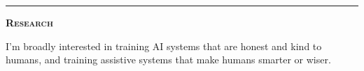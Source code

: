 \documentclass[11 pt]{article}
\begin{document}
\begin{itemize}







\end{itemize}

\vspace{6pt}

\hrule

\begin{center}\begin{Large}\textsc{\textbf{Research}\\}\end{Large}\end{center}

I'm broadly interested in training AI systems that are honest and kind to humans, and training assistive systems that make humans smarter or wiser.
\end{document}
